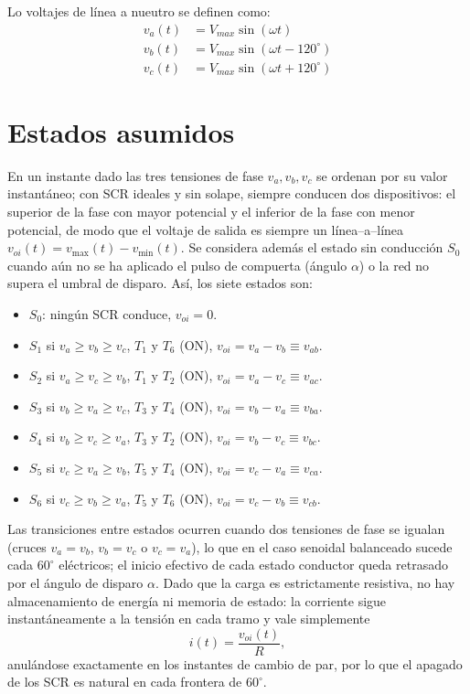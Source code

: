 \documentclass[conference]{IEEEtran}
\begin{document}
Lo voltajes de línea a nueutro se definen como:
\begin{equation*}
	\begin{aligned}
		v_a(t) &= V_{max}\sin(\omega t) \\
		v_b(t) &= V_{max}\sin(\omega t - 120^\circ) \\
		v_c(t) &= V_{max}\sin(\omega t + 120^\circ)
	\end{aligned}
\end{equation*}

\section{Estados asumidos}

	En un instante dado las tres tensiones de fase $v_a,v_b,v_c$ se ordenan por su valor instantáneo; con SCR ideales y sin solape, siempre conducen dos dispositivos: el superior de la fase con mayor potencial y el inferior de la fase con menor potencial, de modo que el voltaje de salida es siempre un línea–a–línea $v_{oi}(t)=v_{\max}(t)-v_{\min}(t)$. Se considera además el estado sin conducción $S_0$ cuando aún no se ha aplicado el pulso de compuerta (ángulo $\alpha$) o la red no supera el umbral de disparo. Así, los siete estados son: 
	
	\begin{itemize}
		\item $S_0$: ningún SCR conduce, $v_{oi}=0$.
		\item $S_1$ si $v_a\ge v_b\ge v_c$, $T_1$ y $T_6$ (ON), $v_{oi}=v_a-v_b\equiv v_{ab}$.
		\item $S_2$ si $v_a\ge v_c\ge v_b$, $T_1$ y $T_2$ (ON), $v_{oi}=v_a-v_c\equiv v_{ac}$.
		\item $S_3$ si $v_b\ge v_a\ge v_c$, $T_3$ y $T_4$ (ON), $v_{oi}=v_b-v_a\equiv v_{ba}$.
		\item $S_4$ si $v_b\ge v_c\ge v_a$, $T_3$ y $T_2$ (ON), $v_{oi}=v_b-v_c\equiv v_{bc}$.
		\item $S_5$ si $v_c\ge v_a\ge v_b$, $T_5$ y $T_4$ (ON), $v_{oi}=v_c-v_a\equiv v_{ca}$.
		\item $S_6$ si $v_c\ge v_b\ge v_a$, $T_5$ y $T_6$ (ON), $v_{oi}=v_c-v_b\equiv v_{cb}$. 
	\end{itemize}

	Las transiciones entre estados ocurren cuando dos tensiones de fase se igualan (cruces $v_a=v_b$, $v_b=v_c$ o $v_c=v_a$), lo que en el caso senoidal balanceado sucede cada $60^\circ$ eléctricos; el inicio efectivo de cada estado conductor queda retrasado por el ángulo de disparo $\alpha$. Dado que la carga es estrictamente resistiva, no hay almacenamiento de energía ni memoria de estado: la corriente sigue instantáneamente a la tensión en cada tramo y vale simplemente
		\begin{equation*}
			i(t)=\frac{v_{oi}(t)}{R},
		\end{equation*}
	anulándose exactamente en los instantes de cambio de par, por lo que el apagado de los SCR es natural en cada frontera de \(60^\circ\).
\end{document}
